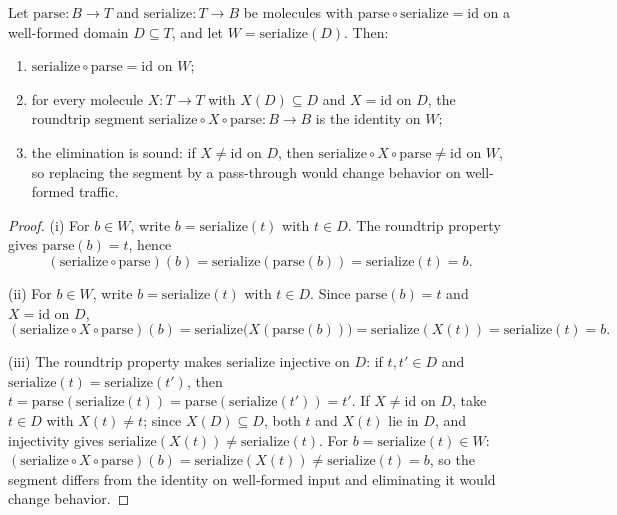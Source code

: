 \begin{theorem}\label{thm:52}
Let $\mathrm{parse} : B \to T$ and $\mathrm{serialize} : T \to B$ be molecules with $\mathrm{parse} \circ \mathrm{serialize} = \mathrm{id}$ on a well-formed domain $D \subseteq T$, and let $W = \mathrm{serialize} (D)$. Then:
\begin{enumerate}
\item $\mathrm{serialize} \circ \mathrm{parse} = \mathrm{id}$ on $W$;
\item for every molecule $X : T \to T$ with $X (D) \subseteq D$ and $X = \mathrm{id}$ on $D$, the roundtrip segment $\mathrm{serialize} \circ X \circ \mathrm{parse} : B \to B$ is the identity on $W$;
\item the elimination is sound: if $X \neq \mathrm{id}$ on $D$, then $\mathrm{serialize} \circ X \circ \mathrm{parse} \neq \mathrm{id}$ on $W$, so replacing the segment by a pass-through would change behavior on well-formed traffic.
\end{enumerate}
\end{theorem}

\begin{proof}
(i) For $b \in W$, write $b = \mathrm{serialize} (t)$ with $t \in D$. The roundtrip property gives $\mathrm{parse} (b) = t$, hence
\[
(\mathrm{serialize} \circ \mathrm{parse})(b) = \mathrm{serialize} (\mathrm{parse} (b)) = \mathrm{serialize} (t) = b .
\]

(ii) For $b \in W$, write $b = \mathrm{serialize} (t)$ with $t \in D$. Since $\mathrm{parse} (b) = t$ and $X = \mathrm{id}$ on $D$,
\[
(\mathrm{serialize} \circ X \circ \mathrm{parse})(b) = \mathrm{serialize}\bigl (X (\mathrm{parse} (b))\bigr) = \mathrm{serialize} (X (t)) = \mathrm{serialize} (t) = b .
\]

(iii) The roundtrip property makes $\mathrm{serialize}$ injective on $D$: if $t, t' \in D$ and $\mathrm{serialize} (t) = \mathrm{serialize} (t')$, then $t = \mathrm{parse} (\mathrm{serialize} (t)) = \mathrm{parse} (\mathrm{serialize} (t')) = t'$. If $X \neq \mathrm{id}$ on $D$, take $t \in D$ with $X (t) \neq t$; since $X (D) \subseteq D$, both $t$ and $X (t)$ lie in $D$, and injectivity gives $\mathrm{serialize} (X (t)) \neq \mathrm{serialize} (t)$. For $b = \mathrm{serialize} (t) \in W$: $(\mathrm{serialize} \circ X \circ \mathrm{parse})(b) = \mathrm{serialize} (X (t)) \neq \mathrm{serialize} (t) = b$, so the segment differs from the identity on well-formed input and eliminating it would change behavior.
\end{proof}

